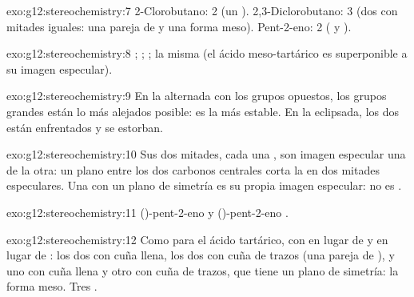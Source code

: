 \begin{solution}{exo:g12:stereochemistry:7}
2-Clorobutano: 2 (un ). 2,3-Diclorobutano: 3 (dos
 con mitades iguales: una pareja de  y
una forma meso). Pent-2-eno: 2 ( y ).
\end{solution}

\begin{solution}{exo:g12:stereochemistry:8}
; ; ; la misma 
(el ácido meso-tartárico es superponible a su imagen especular).
\end{solution}

\begin{solution}{exo:g12:stereochemistry:9}
En la  alternada con los grupos  opuestos, los
grupos grandes están lo más alejados posible: es la más estable. En la
eclipsada, los dos  están enfrentados y se estorban.
\end{solution}

\begin{solution}{exo:g12:stereochemistry:10}
Sus dos mitades, cada una , son imagen especular una de
la otra: un plano entre los dos carbonos centrales corta la  en
dos mitades especulares. Una  con un plano de simetría es su
propia imagen especular: no es .
\end{solution}

\begin{solution}{exo:g12:stereochemistry:11}
()-pent-2-eno 
y ()-pent-2-eno .
\end{solution}

\begin{solution}{exo:g12:stereochemistry:12}
Como para el ácido tartárico, con  en lugar de  y 
en lugar de : los dos  con cuña llena, los dos con cuña
de trazos (una pareja de ), y uno con cuña llena y otro con
cuña de trazos, que tiene un plano de simetría: la forma meso. Tres
.
\end{solution}

